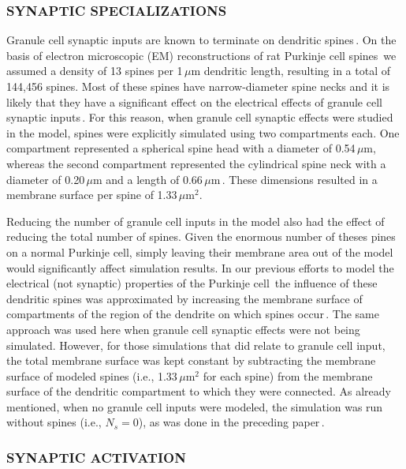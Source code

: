 \documentclass[12pt]{article}
\begin{document}
\subsubsection*{SYNAPTIC SPECIALIZATIONS}

Granule cell synaptic inputs are
known to terminate on dendritic spines\,\cite{Harvey:1991xz, Palay:1974fk}.
On the basis of electron microscopic
(EM) reconstructions of rat Purkinje cell spines\,\cite{M:1988bh}
we assumed a density of 13 spines per 1\,$\mu$m
dendritic length, resulting in a total of 144,456 spines. Most of
these spines have narrow-diameter spine necks and it is likely that
they have a significant effect on the electrical effects of granule cell
synaptic inputs\,\cite{Rall:1990tg}. For this reason, when
granule cell synaptic effects were studied in the model, spines were
explicitly simulated using two compartments each. One compartment
represented a spherical spine head with a diameter of 0.54\,$\mu$m,
whereas the second compartment represented the cylindrical
spine neck with a diameter of 0.20\,$\mu$m and a length of 0.66\,$\mu$m\,\cite{M:1988bh}. These dimensions resulted in a membrane
surface per spine of 1.33\,$\mu$m$^2$.

Reducing the number of granule cell inputs in the model also
had the effect of reducing the total number of spines. Given the
enormous number of theses pines on a normal Purkinje cell, simply
leaving their membrane area out of the model would significantly
affect simulation results. In our previous efforts to model
the electrical (not synaptic) properties of the Purkinje cell\,\cite{deschutter94:_purkin_i}
the influence of these dendritic spines
was approximated by increasing the membrane surface of compartments
of the region of the dendrite on which spines occur\,\cite{R:1989cr, Jaslove:1992fu, Jaslove:1992fu}.
The same approach was used here when granule cell synaptic effects
were not being simulated. However, for those simulations that did
relate to granule cell input, the total membrane surface was kept
constant by subtracting the membrane surface of modeled spines
(i.e., 1.33\,$\mu$m$^2$ for each spine) from the membrane surface of the
dendritic compartment to which they were connected. As already mentioned,
when no granule cell inputs were modeled,
the simulation was run without spines (i.e., $N_s = 0$), as was
done in the preceding paper\,\cite{deschutter94:_purkin_i}.

\subsubsection*{SYNAPTIC ACTIVATION}
\end{document}
